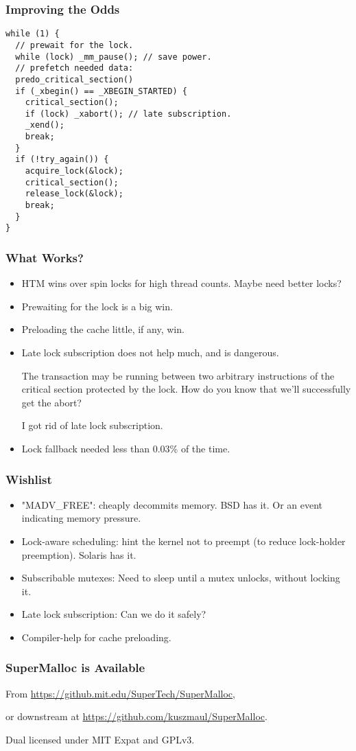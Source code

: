 \documentclass[xcolor=dvipsnames,14pt]{beamer}
\begin{document}
\begin{frame}[fragile]
\frametitle{Improving the Odds}

\begin{verbatim}
while (1) {
  // prewait for the lock.
  while (lock) _mm_pause(); // save power.
  // prefetch needed data:
  predo_critical_section()
  if (_xbegin() == _XBEGIN_STARTED) {
    critical_section();
    if (lock) _xabort(); // late subscription.
    _xend();
    break;
  }
  if (!try_again()) {
    acquire_lock(&lock);
    critical_section();
    release_lock(&lock);
    break;
  }
}
\end{verbatim}
\end{frame}

\begin{frame}
\frametitle{What Works?}

\begin{itemize}
\item HTM wins over spin locks for high thread counts.  Maybe need better locks?
\item Prewaiting for the lock is a big win.
\item Preloading the cache little, if any, win.
\item Late lock subscription does not help much, and is dangerous.  

The transaction may be running between two arbitrary instructions of
the critical section protected by the lock.  How do you know that
we'll successfully get the abort?

I got rid of late lock subscription.
\item Lock fallback needed less than 0.03\% of the time.
\end{itemize}
\end{frame}

\begin{frame}[fragile]
\frametitle{Wishlist}

\begin{itemize}
\item "MADV_FREE": cheaply decommits memory.  BSD has it.
Or an event indicating memory pressure.
\item Lock-aware scheduling: hint the kernel not to preempt (to
reduce lock-holder preemption).  Solaris has it.
\item Subscribable mutexes:  Need to sleep until a mutex unlocks, without locking it.
\item Late lock subscription: Can we do it safely?
\item Compiler-help for cache preloading.
\end{itemize}

\end{frame}

\begin{frame}
\frametitle{SuperMalloc is Available}

From {\small \url{https://github.mit.edu/SuperTech/SuperMalloc}},

or downstream at {\small \url{https://github.com/kuszmaul/SuperMalloc}}.

Dual licensed under MIT Expat and GPLv3.
\end{frame}
\end{document}

